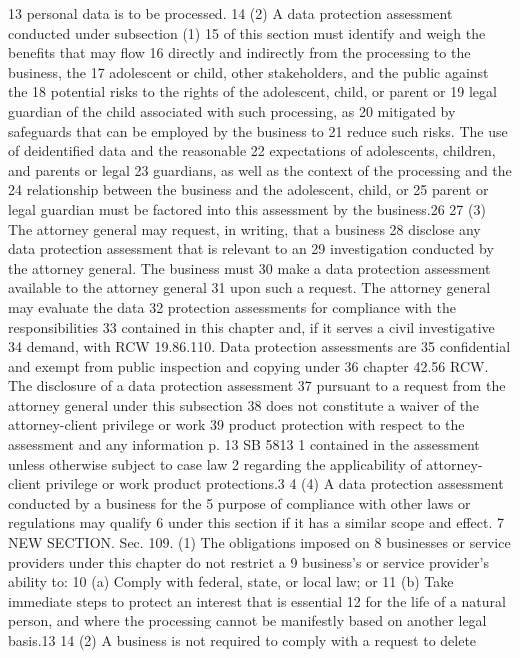 13 personal data is to be processed.
14 (2) A data protection assessment conducted under subsection (1)
15 of this section must identify and weigh the benefits that may flow
16 directly and indirectly from the processing to the business, the
17 adolescent or child, other stakeholders, and the public against the
18 potential risks to the rights of the adolescent, child, or parent or
19 legal guardian of the child associated with such processing, as
20 mitigated by safeguards that can be employed by the business to
21 reduce such risks. The use of deidentified data and the reasonable
22 expectations of adolescents, children, and parents or legal
23 guardians, as well as the context of the processing and the
24 relationship between the business and the adolescent, child, or
25 parent or legal guardian must be factored into this assessment by the
business.26
27 (3) The attorney general may request, in writing, that a business
28 disclose any data protection assessment that is relevant to an
29 investigation conducted by the attorney general. The business must
30 make a data protection assessment available to the attorney general
31 upon such a request. The attorney general may evaluate the data
32 protection assessments for compliance with the responsibilities
33 contained in this chapter and, if it serves a civil investigative
34 demand, with RCW 19.86.110. Data protection assessments are
35 confidential and exempt from public inspection and copying under
36 chapter 42.56 RCW. The disclosure of a data protection assessment
37 pursuant to a request from the attorney general under this subsection
38 does not constitute a waiver of the attorney-client privilege or work
39 product protection with respect to the assessment and any information
p. 13 SB 5813
1 contained in the assessment unless otherwise subject to case law
2 regarding the applicability of attorney-client privilege or work
product protections.3
4 (4) A data protection assessment conducted by a business for the
5 purpose of compliance with other laws or regulations may qualify
6 under this section if it has a similar scope and effect.
7 NEW SECTION. Sec. 109. (1) The obligations imposed on
8 businesses or service providers under this chapter do not restrict a
9 business's or service provider's ability to:
10 (a) Comply with federal, state, or local law; or
11 (b) Take immediate steps to protect an interest that is essential
12 for the life of a natural person, and where the processing cannot be
manifestly based on another legal basis.13
14 (2) A business is not required to comply with a request to delete
